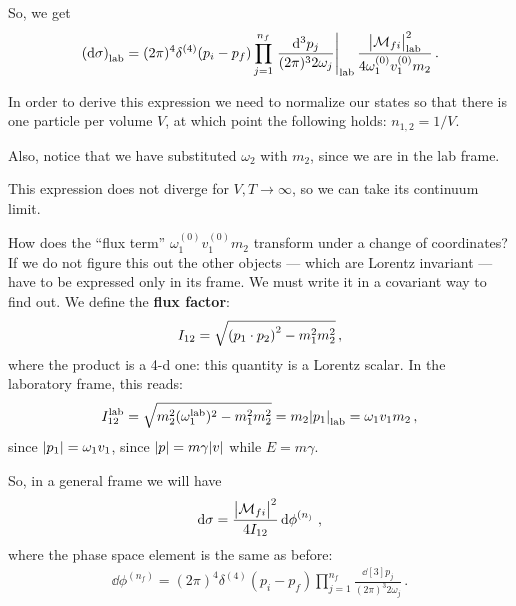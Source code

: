 \documentclass[main.tex]{subfiles}
\begin{document}

So, we get 
%
\begin{align}
\qty(\dd{\sigma }) _{\text{lab}} =
(2 \pi )^{4} \delta^{(4)} (p_i - p_f) 
\prod_{j=1}^{n_f} 
\eval{\frac{ \dd[3]{p_j}}{(2 \pi )^3 2 \omega_{j}}}_{\text{lab}}
\frac{\abs{\mathcal{M}_{fi}}^2 _{\text{lab}}}{4 \omega^{(0)}_{1} v_1^{(0)} m_2 }  
\,.
\end{align}

In order to derive this expression we need to normalize our states so that there is one particle per volume \(V\), at which point the following holds: \(n_{1, 2} = 1/ V\). 

Also, notice that we have substituted \(\omega_2 \) with \(m_2 \), since we are in the lab frame. 

This expression does not diverge for \(V, T \to \infty \), so we can take its continuum limit. 


How does the ``flux term'' \(\omega^{(0)}_{1} v_1^{(0)} m_2\) transform under a change of coordinates? If we do not figure this out the other objects --- which are Lorentz invariant --- have to be expressed only in its frame.
We must write it in a covariant way to find out. We define the \textbf{flux factor}: 
%
\begin{align}
I_{12} = \sqrt{\qty(p_1 \cdot p_2 )^2 - m_1^2 m_2^2 }
\,,
\end{align}
%
where the product is a 4-d one: this quantity is a Lorentz scalar.
In the laboratory frame, this reads: 
%
\begin{align}
I_{12}^{\text{lab}} = \sqrt{m_2^2 (\omega_1^{\text{lab}})^2 -m_1^2 m_2^2}
= m_2 \abs{p_1 }_{\text{lab}} = \omega_{1} v_1 m_2
\,,
\end{align}
%
since \(\abs{p_1 } = \omega_1 v_1 \), since \(\abs{p} = m \gamma \abs{v} \) while \(E = m \gamma \). 

So, in a general frame we will have 
%
\begin{align}
\dd{\sigma } = \frac{\abs{\mathcal{M}_{fi}}^2}{4 I_{12} } \dd{\phi}^{(n_)}
\,,
\end{align}
%
where the phase space element is the same as before: 
%
\begin{align}
\dd{\phi}^{(n_f)} = 
(2 \pi )^{4}
\delta^{(4)} (p_i - p_f)
\prod_{j=1}^{n_f} \frac{ \dd[3]{p_j}}{(2 \pi)^3 2 \omega_{j}}
\,.
\end{align}
\end{document}
